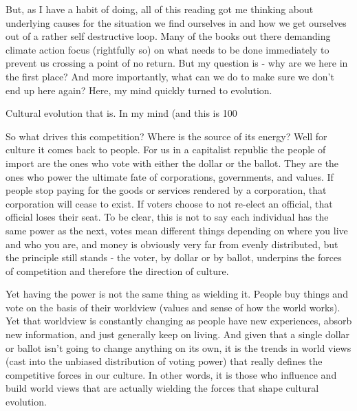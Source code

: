 \documentclass[10pt,a5paper]{book}
\begin{document}
But, as I have a habit of doing, all of this reading got me thinking about underlying causes for the situation we find ourselves in and how we get ourselves out of a rather self destructive loop. Many of the books out there demanding climate action focus (rightfully so) on what needs to be done immediately to prevent us crossing a point of no return. But my question is - why are we here in the first place? And more importantly, what can we do to make sure we don't end up here again? Here, my mind quickly turned to evolution.

Cultural evolution that is. In my mind (and this is 100%

So what drives this competition? Where is the source of its energy? Well for culture it comes back to people. For us in a capitalist republic the people of import are the ones who vote with either the dollar or the ballot. They are the ones who power the ultimate fate of corporations, governments, and values. If people stop paying for the goods or services rendered by a corporation, that corporation will cease to exist. If voters choose to not re-elect an official, that official loses their seat. To be clear, this is not to say each individual has the same power as the next, votes mean different things depending on where you live and who you are, and money is obviously very far from evenly distributed, but the principle still stands - the voter, by dollar or by ballot, underpins the forces of competition and therefore the direction of culture. 

Yet having the power is not the same thing as wielding it. People buy things and vote on the basis of their worldview (values and sense of how the world works). Yet that worldview is constantly changing as people have new experiences, absorb new information, and just generally keep on living. And given that a single dollar or ballot isn't going to change anything on its own, it is the trends in world views (cast into the unbiased distribution of voting power) that really defines the competitive forces in our culture. In other words, it is those who influence and build world views that are actually wielding the forces that shape cultural evolution. 
\end{document}

